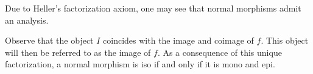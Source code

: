     \begin{remark}
        Due to Heller's factorization axiom, one may see that normal morphisms admit an analysis.

        \begin{center}
        \end{center}

        Observe that the object $I$ coincides with the image and coimage of $f$. This object will then be referred to as the image of $f$. As a consequence of this unique factorization, a normal morphism is iso if and only if it is mono and epi.
    \end{remark}


